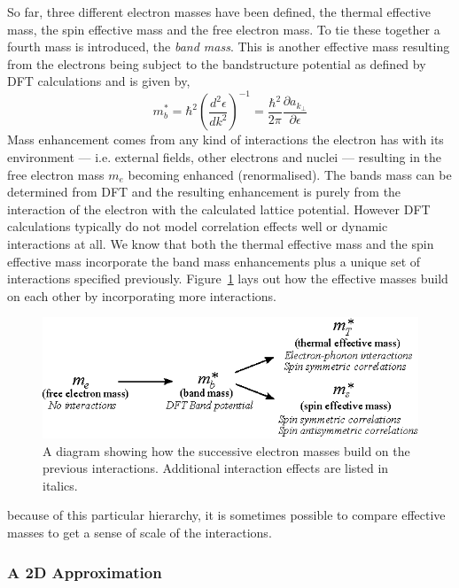 So far, three different electron masses have been defined, the thermal effective mass, the spin effective mass and the free electron mass. To tie these together a fourth mass is introduced, the \textit{band mass}. This is another effective mass resulting from the electrons being subject to the bandstructure potential as defined by \ac{DFT} calculations and is given by,
\begin{equation}
  m^*_b = \hbar^2 \left(\frac{d^2\epsilon}{dk^2}\right)^{-1} = \frac{\hbar^2}{2\pi}\frac{\partial a_{k_\perp}}{\partial \epsilon}
\end{equation}
Mass enhancement comes from any kind of interactions the electron has with its environment --- i.e. external fields, other electrons and nuclei --- resulting in the free electron mass $m_e$ becoming enhanced (renormalised). The bands mass can be determined from \ac{DFT} and the resulting enhancement is purely from the interaction of the electron with the calculated lattice potential. However \ac{DFT} calculations typically do not model correlation effects well or dynamic interactions at all. We know that both the thermal effective mass and the spin effective mass incorporate the band mass enhancements plus a unique set of interactions specified previously. Figure~\ref{Fig:Theo:EffectiveMassInheritance} lays out how the effective masses build on each other by incorporating more interactions.
\begin{figure}[htbp]
    \begin{center}
        \includegraphics[scale=0.9]{Chapter-Theory/Figures/EffectiveMassInheritance/EffectiveMassInheritance}
        \caption{A diagram showing how the successive electron masses build on the previous interactions. Additional interaction effects are listed in italics.}
        \label{Fig:Theo:EffectiveMassInheritance}
    \end{center}
\end{figure}
because of this particular hierarchy, it is sometimes possible to compare effective masses to get a sense of scale of the interactions.

\subsubsection{A 2D Approximation}

